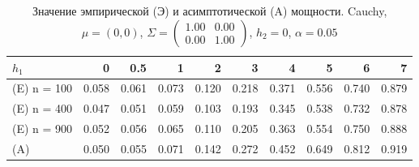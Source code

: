\begin{table}[ht]
\centering
\caption{Значение эмпирической (Э) и асимптотической (A) мощности. Cauchy, $\mu = (0, 0)$, $\Sigma = \begin{pmatrix}
1.00 & 0.00 \\
0.00 & 1.00
\end{pmatrix}$, $h_2 = 0$, $\alpha = 0.05$} 
\label{tab:power_table}
\begin{tabular}{lrrrrrrrrr}
  \hline
$h_{1}$ & 0 & 0.5 & 1 & 2 & 3 & 4 & 5 & 6 & 7 \\ 
  \hline
(E) n = 100 & 0.058 & 0.061 & 0.073 & 0.120 & 0.218 & 0.371 & 0.556 & 0.740 & 0.879 \\ 
  (E) n = 400 & 0.047 & 0.051 & 0.059 & 0.103 & 0.193 & 0.345 & 0.538 & 0.732 & 0.878 \\ 
  (E) n = 900 & 0.052 & 0.056 & 0.065 & 0.110 & 0.205 & 0.363 & 0.554 & 0.750 & 0.888 \\ 
  (A) & 0.050 & 0.055 & 0.071 & 0.142 & 0.272 & 0.452 & 0.649 & 0.812 & 0.919 \\ 
   \hline
\end{tabular}
\end{table}
